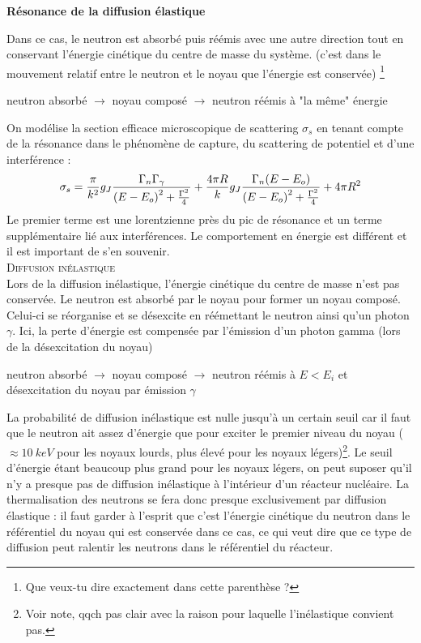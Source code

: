 \textbf{Résonance de la diffusion élastique}

Dans ce cas, le neutron est absorbé puis réémis avec une autre direction tout en conservant
l'énergie cinétique du centre de masse du système.
(c'est dans le mouvement relatif entre le neutron et le noyau que l'énergie est conservée)
\footnote{Que veux-tu dire exactement dans cette parenthèse ?}
\begin{center}
neutron absorbé $\longrightarrow$ noyau composé $\longrightarrow$ neutron réémis à "la même" énergie
\end{center}


On modélise la section efficace microscopique de scattering $\sigma_s$ en tenant compte
de la résonance dans le phénomène de capture, du scattering de potentiel et d'une interférence :
\begin{equation}
{\sigma _s} = \frac{\pi }{{{k^2}}}{g_J}\frac{{{\Gamma _n}{\Gamma _\gamma }}}{{{{(E - {E_o})}^2} + {\textstyle{{{\Gamma ^2}} \over 4}}}} + \frac{{4\pi R}}{k}{g_J}\frac{{{\Gamma _n}(E - {E_o})}}{{{{(E - {E_o})}^2} + {\textstyle{{{\Gamma ^2}} \over 4}}}} + 4\pi {R^2}
\end{equation}
Le premier terme est une lorentzienne près du pic de résonance et un terme supplémentaire lié aux 
interférences. Le comportement en énergie est différent et il est important de s'en souvenir. \\

\textsc{Diffusion inélastique}\\
Lors de la diffusion inélastique, l'énergie cinétique du centre de masse n'est pas conservée.
Le neutron est absorbé par le noyau pour former un noyau composé. Celui-ci se réorganise et
se désexcite en réémettant le neutron ainsi qu'un photon $\gamma$.
Ici, la perte d'énergie est compensée par l'émission d'un photon gamma (lors de la désexcitation 
du noyau)
\begin{center}
neutron absorbé $\longrightarrow$ noyau composé $\longrightarrow$ neutron réémis à $E<E_i$
et désexcitation du noyau par émission $\gamma$
\end{center}
La probabilité de diffusion inélastique est nulle jusqu'à un certain seuil car il faut que le neutron
ait assez d'énergie que pour exciter le premier niveau du noyau ($\approx 10\ keV$ pour les 
noyaux lourds, plus élevé pour les noyaux légers)\footnote{Voir note, qqch pas clair avec la 
raison pour laquelle l'inélastique convient pas.}. 
Le seuil d'énergie étant beaucoup plus grand pour les noyaux légers, on peut suposer qu'il n'y
a presque pas de diffusion inélastique à l'intérieur d'un réacteur nucléaire.
La thermalisation des neutrons se fera donc presque exclusivement par diffusion élastique : il faut garder
à l'esprit que c'est l'énergie cinétique du neutron dans le référentiel du noyau qui est conservée dans ce
cas, ce qui veut dire que ce type de diffusion peut ralentir les neutrons dans le référentiel du réacteur.\\

